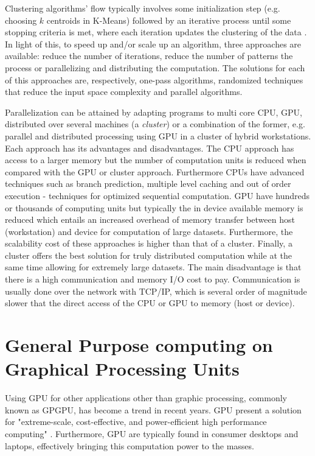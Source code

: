 Clustering algorithms' flow typically involves some initialization step (e.g. choosing $k$ centroids in K-Means) followed by an iterative process until some stopping criteria is met, where each iteration updates the clustering of the data \cite{Aggarwal2014}. In light of this, to speed up and/or scale up an algorithm, three approaches are available: reduce the number of iterations, reduce the number of patterns the process or parallelizing and distributing the computation. The solutions for each of this approaches are, respectively, one-pass algorithms, randomized techniques that reduce the input space complexity and parallel algorithms.

Parallelization can be attained by adapting programs to multi core CPU, GPU, distributed over several machines (a \emph{cluster}) or a combination of the former, e.g. parallel and distributed processing using GPU in a cluster of hybrid workstations.
Each approach has its advantages and disadvantages.
The CPU approach has access to a larger memory but the number of computation units is reduced when compared with the GPU or cluster approach. Furthermore CPUs have advanced techniques such as branch prediction, multiple level caching and out of order execution - techniques for optimized sequential computation.
GPU have hundreds or thousands of computing units but typically the in device available memory is reduced which entails an increased overhead of memory transfer between host (workstation) and device for computation of large datasets.
Furthermore, the scalability cost of these approaches is higher than that of a cluster.
Finally, a cluster offers the best solution for truly distributed computation while at the same time allowing for extremely large datasets. The main disadvantage is that there is a high communication and memory I/O cost to pay. Communication is usually done over the network with TCP/IP, which is several order of magnitude slower that the direct access of the CPU or GPU to memory (host or device).


	

\section{General Purpose computing on Graphical Processing Units}
\label{sec:gpgpu}
Using GPU for other applications other than graphic processing, commonly known as GPGPU, has become a trend in recent years. GPU present a solution for "extreme-scale, cost-effective, and power-efficient high performance computing" \cite{Chen2012}. Furthermore, GPU are typically found in consumer desktops and laptops, effectively bringing this computation power to the masses.

